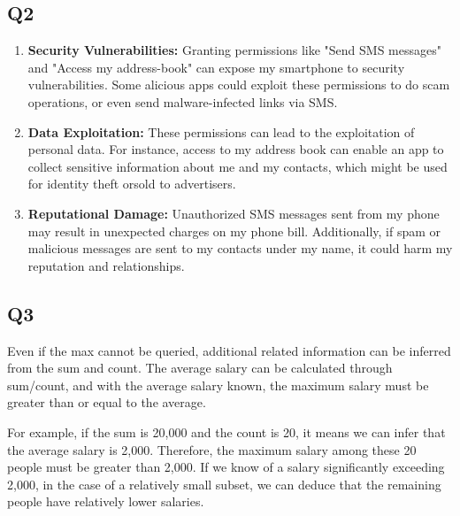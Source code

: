 \documentclass{article}
\begin{document}
\subsection{Q2}
	\begin{enumerate}
		\item \textbf{Security Vulnerabilities:} Granting permissions like "Send SMS messages" and "Access my address-book" can expose my smartphone to security vulnerabilities. Some alicious apps could exploit these permissions to do scam operations, or even send malware-infected links via SMS.

		\item \textbf{Data Exploitation:} These permissions can lead to the exploitation of personal data. For instance, access to my address book can enable an app to collect sensitive information about me and my contacts, which might be used for identity theft orsold to advertisers.

		\item \textbf{Reputational Damage:} Unauthorized SMS messages sent from my phone may result in unexpected charges on my phone bill. Additionally, if spam or malicious messages are sent to my contacts under my name, it could harm my reputation and relationships.
	\end{enumerate}


\subsection{Q3}
	Even if the max cannot be queried, additional related information can be inferred from the sum and count. The average salary can be calculated through sum/count, and with the average salary known, the maximum salary must be greater than or equal to the average.

	For example, if the sum is 20,000 and the count is 20, it means we can infer that the average salary is 2,000. Therefore, the maximum salary among these 20 people must be greater than 2,000. If we know of a salary significantly exceeding 2,000, in the case of a relatively small subset, we can deduce that the remaining people have relatively lower salaries.


 
\end{document}

